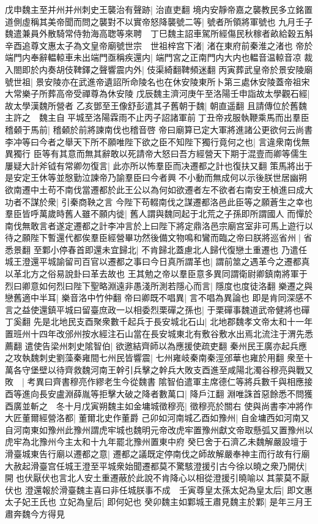 戊申魏主至并州并州刺史王襲治有聲跡|{
	治直吏翻}
境内安靜帝嘉之襲教民多立銘置道側虛稱其美帝聞而問之襲對不以實帝怒降襲號二等|{
	號者所領將軍號也}
九月壬子魏遣兼員外散騎常侍勃海高聦等來聘　丁巳魏主詔車駕所經傷民秋稼者畝給穀五斛　辛酉追尊文惠太子為文皇帝廟號世宗　世祖梓宫下渚|{
	渚在東府前秦淮之渚也}
帝於端門内奉辭輼輬車未出端門亟稱疾還内|{
	端門宮之正南門内大内也輼音温輬音凉}
裁入閤即於内奏胡伎鞞鐸之聲響震内外|{
	伎渠綺翻鞞頻迷翻}
丙寅葬武皇帝於景安陵廟號世祖|{
	景安陵亦在武進帝遺詔所命陵名也在休安陵東所卜第三處休安陵蓋帝祖宋大常樂子所葬高帝受禪尊為休安陵}
戊辰魏主濟河庚午至洛陽壬申詣故太學觀石經|{
	故太學漢魏所營者}
乙亥鄧至王像舒彭遣其子舊朝于魏|{
	朝直遥翻}
且請傳位於舊魏主許之　魏主自平城至洛陽霖雨不止丙子詔諸軍前丁丑帝戎服執鞭乘馬而出羣臣稽顙于馬前|{
	稽顙於前將諫南伐也稽音啓}
帝曰廟算已定大軍將進諸公更欲何云尚書李冲等曰今者之舉天下所不願唯陛下欲之臣不知陛下獨行竟何之也|{
	言違衆南伐無異獨行}
臣等有其意而無其辭敢以死請帝大怒曰吾方經營天下期于混壹而卿等儒生屢疑大計斧钺有常卿勿復言|{
	此亦所以怖羣臣而决遷都之計也復扶又翻}
策馬將出于是安定王休等並慇勤泣諫帝乃諭羣臣曰今者興不小動而無成何以示後朕世居幽朔欲南遷中土苟不南伐當遷都於此王公以為何如欲遷者左不欲者右南安王楨進曰成大功者不謀於衆|{
	引秦商鞅之言}
今陛下苟輟南伐之謀遷都洛邑此臣等之願蒼生之幸也羣臣皆呼萬歲時舊人雖不願内徙|{
	舊人謂與魏同起于北荒之子孫即所謂國人}
而憚於南伐無敢言者遂定遷都之計李冲言於上曰陛下將定鼎洛邑宗廟宫室非可馬上遊行以待之願陛下暫還代都俟羣臣經營畢功然後備文物鳴和鸞而臨之帝曰朕將巡省州|{
	省悉景翻}
至鄴小停春首即還未宜歸北|{
	不肯歸北蓋慮北人歸代復戀土重遷也}
乃遣任城王澄還平城諭留司百官以遷都之事曰今日真所謂革也|{
	謂前筮之遇革今之遷都真以革北方之俗易說卦曰革去故也}
王其勉之帝以羣臣意多異同謂衛尉卿鎮南將軍于烈曰卿意如何烈曰陛下聖略淵遠非愚淺所測若隱心而言|{
	隱度也度徒洛翻}
樂遷之與戀舊適中半耳|{
	樂音洛中竹仲翻}
帝曰卿既不唱異|{
	言不唱為異論也}
即是肯同深感不言之益使還鎮平城曰留臺庶政一以相委烈栗磾之孫也|{
	于栗磾事魏道武帝健將也磾丁奚翻}
先是北地民支酉聚衆數千起兵于長安城北石山|{
	北地郡魏孝文帝太和十一年置班州十四年改邠州按水經注石山當在長安城東北有敷谷敷水出焉北流注于渭先悉薦翻}
遣使告梁州刺史隂智伯|{
	欲邀結齊師以為應援使疏吏翻}
秦州民王廣亦起兵應之攻執魏刺史劉藻秦雍間七州民皆響震|{
	七州雍岐秦南秦涇邠華也雍於用翻}
衆至十萬各守堡壁以待齊救魏河南王幹引兵擊之幹兵大敗支酉進至咸陽北濁谷穆亮與戰又敗　|{
	考異曰齊書穆亮作繆老生今從魏書}
隂智伯遣軍主席德仁等將兵數千與相應接酉等進向長安盧淵薛胤等拒擊大破之降者數萬口|{
	降戶江翻}
淵唯誅首惡餘悉不問獲酉廣並斬之　冬十月戊寅朔魏主如金墉城徵穆亮|{
	徵穆亮於關右}
使與尚書李冲將作大匠董爾經營洛都|{
	董爾北史作董爵}
己卯如河南城乙酉如豫州|{
	自金墉西如河南又自河南東如豫州此豫州謂虎牢城也魏明元帝改虎牢置豫州獻文帝取懸弧又置豫州以虎牢為北豫州今主太和十九年罷北豫州置東中府}
癸巳舍于石濟乙未魏解嚴設壇于滑臺城東告行廟以遷都之意|{
	遷都之議既定停南伐之師故解嚴奉神主而行故有行廟}
大赦起滑臺宫任城王澄至平城衆始聞遷都莫不驚駭澄援引古今徐以曉之衆乃開伏|{
	開也伏厭伏也言北人安土重遷蔽於此說不肯降心以相從澄援引曉喻以其蒙莫不厭伏也}
澄還報於滑臺魏主喜曰非任城朕事不成　壬寅尊皇太孫太妃為皇太后|{
	即文惠太子妃王氏也}
立妃為皇后|{
	即何妃也}
癸卯魏主如鄴城王肅見魏主於鄴|{
	是年三月王肅奔魏今方得見}


